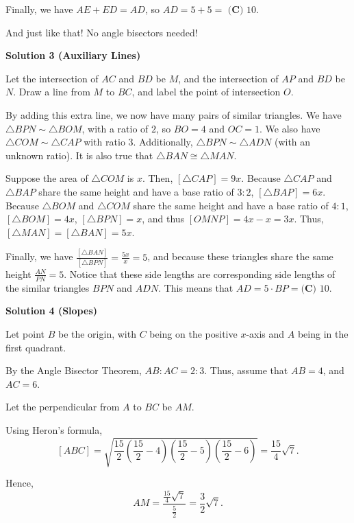 \begin{enumerate}
 Finally, we have \( AE + ED = AD \), so \( AD = 5 + 5 =\) $\boxed{\textbf{(C) } 10}.$

 And just like that! No angle bisectors needed! 

 



\textbf{Solution 3 (Auxiliary Lines)}

Let the intersection of $AC$ and $BD$ be $M$, and the intersection of $AP$ and $BD$ be $N$. Draw a line from $M$ to $BC$, and label the point of intersection $O$. 

 By adding this extra line, we now have many pairs of similar triangles. We have $\triangle BPN \sim \triangle BOM$, with a ratio of $2$, so $BO = 4$ and $OC = 1$. We also have $\triangle COM \sim \triangle CAP$ with ratio $3$. Additionally, $\triangle BPN \sim \triangle ADN$ (with an unknown ratio). It is also true that $\triangle BAN \cong \triangle MAN$. 

 Suppose the area of $\triangle COM$ is $x$. Then, $[\triangle CAP] = 9x$. Because $\triangle CAP$ and $\triangle BAP$ share the same height and have a base ratio of $3:2$, $[\triangle BAP] = 6x$. Because $\triangle BOM$ and $\triangle COM$ share the same height and have a base ratio of $4:1$, $[\triangle BOM] = 4x$, $[\triangle BPN] = x$, and thus $[OMNP] = 4x - x = 3x$. Thus, $[\triangle MAN] = [\triangle BAN] = 5x$. 

 Finally, we have $\frac{[\triangle BAN]}{[\triangle BPN]} = \frac{5x}{x} = 5$, and because these triangles share the same height $\frac{AN}{PN} = 5$. Notice that these side lengths are corresponding side lengths of the similar triangles $BPN$ and $ADN$. This means that $AD = 5\cdot BP = \boxed{\textbf{(C) } 10}$.

 



\textbf{Solution 4 (Slopes)}

Let point $B$ be the origin, with $C$ being on the positive $x$-axis and $A$ being in the first quadrant.

 By the Angle Bisector Theorem, $AB:AC = 2:3$. Thus, assume that $AB = 4$, and $AC = 6$.

 Let the perpendicular from $A$ to $BC$ be $AM$. 

 Using Heron's formula, 
 \[[ABC] = \sqrt{\frac{15}{2}\left(\frac{15}{2}-4\right)\left(\frac{15}{2}-5\right)\left(\frac{15}{2}-6\right)} = \frac{15}{4}\sqrt{7}.\]

 Hence, 
 \[AM = \frac{\frac{15}{4}\sqrt{7}}{\frac{5}{2}} = \frac{3}{2}\sqrt{7}.\]


\end{enumerate}
